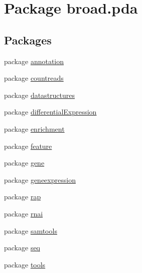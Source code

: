 \hypertarget{namespacebroad_1_1pda}{\section{Package broad.\+pda}
\label{namespacebroad_1_1pda}
}
\subsection*{Packages}
\begin{DoxyCompactItemize}
\item 
package \hyperlink{namespacebroad_1_1pda_1_1annotation}{annotation}
\item 
package \hyperlink{namespacebroad_1_1pda_1_1countreads}{countreads}
\item 
package \hyperlink{namespacebroad_1_1pda_1_1datastructures}{datastructures}
\item 
package \hyperlink{namespacebroad_1_1pda_1_1differential_expression}{differential\+Expression}
\item 
package \hyperlink{namespacebroad_1_1pda_1_1enrichment}{enrichment}
\item 
package \hyperlink{namespacebroad_1_1pda_1_1feature}{feature}
\item 
package \hyperlink{namespacebroad_1_1pda_1_1gene}{gene}
\item 
package \hyperlink{namespacebroad_1_1pda_1_1geneexpression}{geneexpression}
\item 
package \hyperlink{namespacebroad_1_1pda_1_1rap}{rap}
\item 
package \hyperlink{namespacebroad_1_1pda_1_1rnai}{rnai}
\item 
package \hyperlink{namespacebroad_1_1pda_1_1samtools}{samtools}
\item 
package \hyperlink{namespacebroad_1_1pda_1_1seq}{seq}
\item 
package \hyperlink{namespacebroad_1_1pda_1_1tools}{tools}
\end{DoxyCompactItemize}
